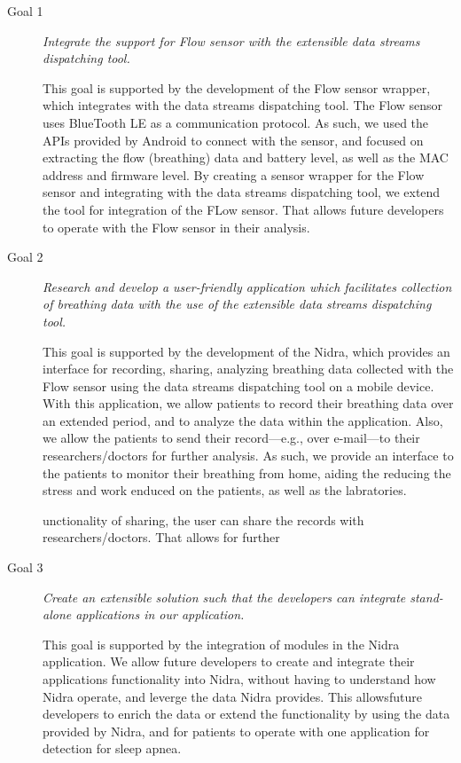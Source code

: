 \begin{description}
    \item[Goal 1] \textit{Integrate the support for Flow sensor with the extensible data streams dispatching tool.}

    This goal is supported by the development of the Flow sensor wrapper, which integrates with the data streams dispatching tool. The Flow sensor uses BlueTooth LE as a communication protocol. As such, we used the APIs provided by Android to connect with the sensor, and focused on extracting the flow (breathing) data and battery level, as well as the MAC address and firmware level. By creating a sensor wrapper for the Flow sensor and integrating with the data streams dispatching tool, we extend the tool for integration of the FLow sensor. That allows future developers to operate with the Flow sensor in their analysis.


    \item[Goal 2] \textit{Research and develop a user-friendly application which facilitates collection of breathing data with the use of the extensible data streams dispatching tool.}

    This goal is supported by the development of the Nidra, which provides an interface for recording, sharing, analyzing breathing data collected with the Flow sensor using the data streams dispatching tool on a mobile device. With this application, we allow patients to record their breathing data over an extended period, and to analyze the data within the application. Also, we allow the patients to send their record---e.g., over e-mail---to their researchers/doctors for further analysis. As such, we provide an interface to the patients to monitor their breathing from home, aiding the reducing the stress and work enduced on the patients, as well as the labratories. 
    
    unctionality of sharing, the user can share the records with researchers/doctors. That allows for further 

    \item[Goal 3] \textit{Create an extensible solution such that the developers can integrate stand-alone applications in our application.}

    This goal is supported by the integration of modules in the Nidra application. We allow future developers to create and integrate their applications functionality into Nidra, without having to understand how Nidra operate, and leverge the data Nidra provides. This allowsfuture developers to enrich the data or extend the functionality by using the data provided by Nidra, and for patients to operate with one application for detection for sleep apnea. 
\end{description}


